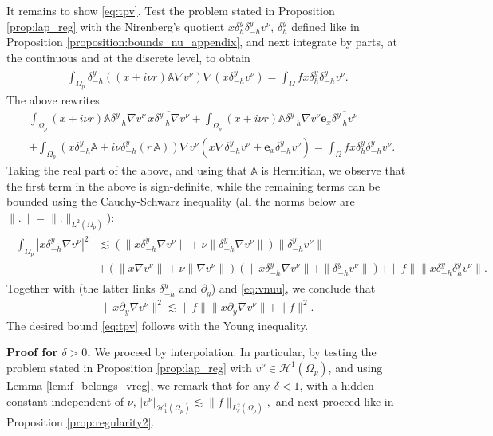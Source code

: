 \documentclass[report]{elsarticle}
\numberwithin{theorem}{section}
\renewcommand{\vec}[1]{\mathbf{#1}}
\begin{document}
It remains to show \eqref{eq:tpv}. Test the problem stated in Proposition \ref{prop:lap_reg} with the Nirenberg's quotient $x\delta_h^y \delta_{-h}^y v^{\nu}$, $\delta_h^y$  defined like in Proposition \ref{proposition:bounds_nu_appendix}, and next integrate by parts, at the continuous and at the discrete level, to obtain
\begin{align*}
	\int_{\Omega_p}\delta^y_{-h}\left((x+i\nu r)\mathbb{A}\nabla v^{\nu}\right)\overline{\nabla (x\delta^y_{-h}v^{\nu})}=\int_{\Omega}f x\overline{\delta_h^y \delta_{-h}^y v^{\nu}}.
\end{align*}
The above rewrites 
\begin{align*}
	&\int_{\Omega_p}(x+i\nu r)\mathbb{A}\delta^y_{-h}\nabla v^{\nu}\,\overline{x\delta^y_{-h}\nabla v^{\nu}}+\int_{\Omega_p}(x+i\nu r)\mathbb{A}\delta^y_{-h}\nabla v^{\nu}\vec{e}_x\overline{\delta_{-h}^y v^{\nu}}\\
	&+
	\int_{\Omega_p}(x\delta_{-h}^y\mathbb{A}+i\nu \delta_{-h}^y(r\, \mathbb{A}))\nabla v^{\nu}\left(x\overline{\nabla \delta_{-h}^y v^{\nu}}+\overline{\vec{e}_x \delta_{-h}^y v^{\nu}}\right)=\int_{\Omega}f x\overline{\delta_h^y \delta_{-h}^y v^{\nu}}.
\end{align*}
Taking the real part of the above, and using that $\mathbb{A}$ is Hermitian, we observe that the first term in the above is sign-definite, while the remaining terms can be bounded using the Cauchy-Schwarz inequality (all the norms below are $\|.\|=\|.\|_{L^2(\Omega_p)}$):
\begin{align}
	\begin{split}
		\int_{\Omega_p}|x\delta_{-h}^y\nabla v^{\nu}|^2&\lesssim 
		(\|x\delta_{-h}^y\nabla v^{\nu}\|+\nu\|\delta_{-h}^y\nabla v^{\nu}\|)\|\delta_{-h}^y v^{\nu}\|\\
		&+\left(\|x	\nabla v^{\nu}\|+\nu\|\nabla v^{\nu}\|\right)(\|x\delta_{-h}^y\nabla v^{\nu}\|+\|\delta_{-h}^y v^{\nu}\|)+\|f\|\|x\delta_{-h}^y\delta_{h}^y v^{\nu}\|.
	\end{split}
\end{align}
Together with \cite[Lemma 4.13]{mclean} (the latter links $\delta_{-h}^y$ and $\partial_y$) and \eqref{eq:vnuu}, we conclude that 
\begin{align*}
	\|x\partial_y\nabla v^{\nu}\|^2\lesssim \|f\|\|x\partial_y\nabla v^{\nu}\|+\|f\|^2.
\end{align*}
The desired bound \eqref{eq:tpv} follows with the Young inequality.
  
\textbf{Proof for $\delta>0$. }We proceed by interpolation. In particular, by testing the problem stated in Proposition \ref{prop:lap_reg} with $v^{\nu}\in \mathcal{H}^1(\Omega_p)$, and using Lemma \ref{lem:f_belongs_vreg}, we remark that for any $\delta<1$, with a hidden constant independent of $\nu$, $
	|v^{\nu}|_{\mathcal{H}^1_{1}(\Omega_p)}\lesssim \|f\|_{L^2_{\delta}(\Omega_p)},$ 
and next proceed like in Proposition \ref{prop:regularity2}. 
\end{document}

